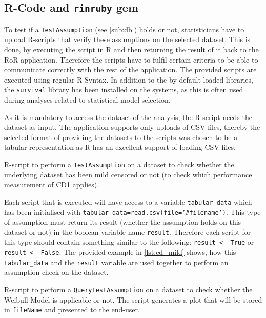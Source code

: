 \subsection{R-Code and \texttt{rinruby} gem}
\label{sec:r_code}

To test if a \texttt{TestAssumption} (see \autoref{sub:db}) holds or not, statisticians have to upload \gls{R}-scripts that verify these assumptions on the selected dataset. This is done, by executing the script in R and then returning the result of it back to the \gls{RoR} application. Therefore the scripts have to fulfil certain criteria to be able to communicate correctly with the rest of the application. The provided scripts are executed using regular R-Syntax. In addition to the by default loaded libraries, the \texttt{survival} library has been installed on the systems, as this is often used during analyses related to statistical model selection.

As it is mandatory to access the dataset of the analysis, the R-script needs the dataset as input. The application supports only uploads of CSV files, thereby the selected format of providing the datasets to the scripts was chosen to be a tabular representation as R has an excellent support of loading CSV files.

\begin{listing}[!htp]
	\caption{R-script to perform a \texttt{TestAssumption} on a dataset to check whether the underlying dataset has been mild censored or not (to check which performance measurement of \gls{CD}1 applies). }
	\label{lst:cd_mild}
\end{listing}


Each script that is executed will have access to a variable \texttt{tabular\_data} which has been initialised with \texttt{tabular\_data=read.csv(file='\#{filename}')}. This type of assumption must return its result (whether the assumption holds on this dataset or not) in the boolean variable name \texttt{result}. Therefore each script for this type should contain something similar to the following: \texttt{result <- True} or \texttt{result <- False}. The provided example in \cref{lst:cd_mild} shows, how this \texttt{tabular\_data} and the \texttt{result} variable are used together to perform an assumption check on the dataset.

\begin{listing}[!htp]
	\caption{R-script to perform a \texttt{QueryTestAssumption} on a dataset to check whether the Weibull-Model is applicable or not. The script generates a plot that will be stored in \texttt{fileName} and presented to the end-user.}
	\label{lst:rcode}
\end{listing}

